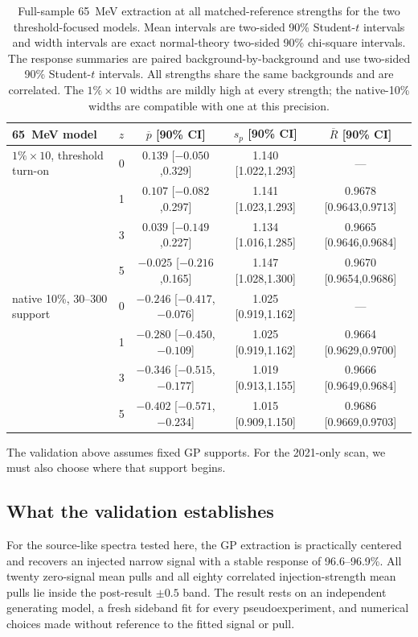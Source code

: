 \begin{table}[htbp]
\centering
\small
\begin{tabular}{llccc}
\toprule
65~MeV model & $z$ & $\overline p$ [90\% CI] & $s_p$ [90\% CI] & $\overline R$ [90\% CI] \\
\midrule
$1\%\times10$, threshold turn-on & 0 & $0.139$ [$-0.050$,0.329] & 1.140 [1.022,1.293] & --- \\
 & 1 & $0.107$ [$-0.082$,0.297] & 1.141 [1.023,1.293] & 0.9678 [0.9643,0.9713] \\
 & 3 & $0.039$ [$-0.149$,0.227] & 1.134 [1.016,1.285] & 0.9665 [0.9646,0.9684] \\
 & 5 & $-0.025$ [$-0.216$,0.165] & 1.147 [1.028,1.300] & 0.9670 [0.9654,0.9686] \\
\addlinespace
native 10\%, 30--300 support & 0 & $-0.246$ [$-0.417$,$-0.076$] & 1.025 [0.919,1.162] & --- \\
 & 1 & $-0.280$ [$-0.450$,$-0.109$] & 1.025 [0.919,1.162] & 0.9664 [0.9629,0.9700] \\
 & 3 & $-0.346$ [$-0.515$,$-0.177$] & 1.019 [0.913,1.155] & 0.9666 [0.9649,0.9684] \\
 & 5 & $-0.402$ [$-0.571$,$-0.234$] & 1.015 [0.909,1.150] & 0.9686 [0.9669,0.9703] \\
\bottomrule
\end{tabular}
\caption{Full-sample 65~MeV extraction at all matched-reference strengths for the two
threshold-focused models. Mean intervals are two-sided 90\% Student-$t$ intervals and
width intervals are exact normal-theory two-sided 90\% chi-square intervals.  The
response summaries are paired background-by-background and use two-sided 90\%
Student-$t$ intervals.  All strengths share the same backgrounds and are correlated.  The
$1\%\times10$ widths are mildly high at every strength; the native-10\% widths are
compatible with one at this precision.}
\label{tab:v491-injection-recovery}
\end{table}

\ifwritingsample
The validation above assumes fixed GP supports. For the 2021-only scan, we must also
choose where that support begins.


\fi

\subsection{What the validation establishes}

For the source-like spectra tested here, the GP extraction is practically centered and
recovers an injected narrow signal with a stable response of 96.6--96.9\%. All twenty
zero-signal mean pulls and all eighty correlated injection-strength mean pulls lie
inside the post-result $\pm0.5$ band. The result rests on an independent generating
model, a fresh sideband fit for every pseudoexperiment, and numerical choices made
without reference to the fitted signal or pull.

